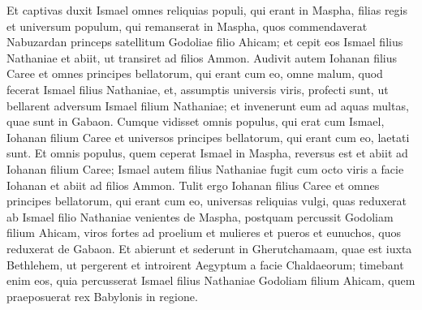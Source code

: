 \begin{biblechapter}
\begin{biblechapter}
\begin{biblechapter}
\begin{biblechapter}
\begin{biblechapter}
\begin{biblechapter}
\begin{biblechapter}
\begin{biblechapter}
\begin{biblechapter}
\begin{biblechapter}
\begin{biblechapter}
\begin{biblechapter}
\begin{biblechapter}
\begin{biblechapter}
\begin{biblechapter}
\begin{biblechapter}
\begin{biblechapter}
\begin{biblechapter}
\begin{biblechapter}
\begin{biblechapter}
\begin{biblechapter}
\begin{biblechapter}
\begin{biblechapter}
\begin{biblechapter}
\begin{biblechapter}
\begin{biblechapter}
\begin{biblechapter}
\begin{biblechapter}
\begin{biblechapter}
\begin{biblechapter}
\begin{biblechapter}
\begin{biblechapter}
\begin{biblechapter}
\begin{biblechapter}
\begin{biblechapter}
\begin{biblechapter}
\begin{biblechapter}
\begin{biblechapter}
\begin{biblechapter}
\begin{biblechapter}
\begin{biblechapter}
\verse Et captivas duxit Ismael omnes reliquias populi, qui erant in Maspha, filias regis et universum populum, qui remanserat in Maspha, quos commendaverat Nabuzardan princeps satellitum Godoliae filio Ahicam; et cepit eos Ismael filius Nathaniae et abiit, ut transiret ad filios Ammon.
 \verse Audivit autem Iohanan filius Caree et omnes principes bellatorum, qui erant cum eo, omne malum, quod fecerat Ismael filius Nathaniae, 
\verse et, assumptis universis viris, profecti sunt, ut bellarent adversum Ismael filium Nathaniae; et invenerunt eum ad aquas multas, quae sunt in Gabaon. 
\verse Cumque vidisset omnis populus, qui erat cum Ismael, Iohanan filium Caree et universos principes bellatorum, qui erant cum eo, laetati sunt. 
\verse Et omnis populus, quem ceperat Ismael in Maspha, reversus est et abiit ad Iohanan filium Caree; 
\verse Ismael autem filius Nathaniae fugit cum octo viris a facie Iohanan et abiit ad filios Ammon.
 \verse Tulit ergo Iohanan filius Caree et omnes principes bellatorum, qui erant cum eo, universas reliquias vulgi, quas reduxerat ab Ismael filio Nathaniae venientes de Maspha, postquam percussit Godoliam filium Ahicam, viros fortes ad proelium et mulieres et pueros et eunuchos, quos reduxerat de Gabaon. 
\verse Et abierunt et sederunt in Gherutchamaam, quae est iuxta Bethlehem, ut pergerent et introirent Aegyptum 
\verse a facie Chaldaeorum; timebant enim eos, quia percusserat Ismael filius Nathaniae Godoliam filium Ahicam, quem praeposuerat rex Babylonis in regione.
 

\end{biblechapter}
\end{biblechapter}
\end{biblechapter}
\end{biblechapter}
\end{biblechapter}
\end{biblechapter}
\end{biblechapter}
\end{biblechapter}
\end{biblechapter}
\end{biblechapter}
\end{biblechapter}
\end{biblechapter}
\end{biblechapter}
\end{biblechapter}
\end{biblechapter}
\end{biblechapter}
\end{biblechapter}
\end{biblechapter}
\end{biblechapter}
\end{biblechapter}
\end{biblechapter}
\end{biblechapter}
\end{biblechapter}
\end{biblechapter}
\end{biblechapter}
\end{biblechapter}
\end{biblechapter}
\end{biblechapter}
\end{biblechapter}
\end{biblechapter}
\end{biblechapter}
\end{biblechapter}
\end{biblechapter}
\end{biblechapter}
\end{biblechapter}
\end{biblechapter}
\end{biblechapter}
\end{biblechapter}
\end{biblechapter}
\end{biblechapter}
\end{biblechapter}
